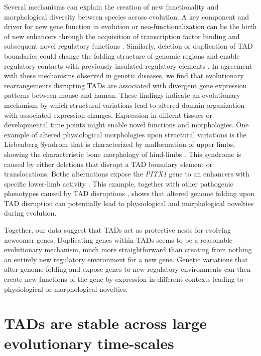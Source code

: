 \documentclass[a4paper,twoside=true,openright,parskip=full,chapterprefix=true,11pt,headings=normal,bibliography=totoc,listof=totoc,titlepage=on,captions=tableabove,draft=false]{scrreprt}
\theoremstyle{definition}
\theoremstyle{definition}
\theoremstyle{definition}
\theoremstyle{remark}
\begin{document}
Several mechanisms can explain the creation of new functionality and
morphological diversity between species across evolution. A key
component and driver for new gene function in evolution or
neo-functionalization can be the birth of new enhancers through the
acquisition of transcription factor binding and subsequent novel
regulatory functions \citep{Long2016}. Similarly, deletion or
duplication of TAD boundaries could change the folding structure of
genomic regions and enable regulatory contacts with previously insulated
regulatory elements \citep{Ibn-Salem2014, Lupianez2015, Franke2017}. In
agreement with these mechanisms observed in genetic diseases, we find
that evolutionary rearrangements disrupting TADs are associated with
divergent gene expression patterns between mouse and human. These
findings indicate an evolutionary mechanism by which structural
variations lead to altered domain organization with associated
expression changes. Expression in differnt tissues or developmental time
points might enable novel functions and morphologies. One example of
altered physiological morphologies upon structural variations is the
Liebenberg Syndrom that is characterized by malformation of upper limbs,
showing the characteristic bone morphology of hind-limbs
\citep{Spielmann2012}. This syndrome is caused by either deletions that
disrupt a TAD boundary element or translocations. Bothe alternations
expose the \emph{PITX1} gene to an enhancers with specific lower-limb
activity \citep{Spielmann2013a}. This example, together with other
pathogenic phenotypes caused by TAD disruptions
\citep{Lupianez2015, Franke2016, Flottmann2017}, shows that altered
genome folding upon TAD disruption can potentially lead to physiological
and morphological novelties during evolution.

Together, our data suggest that TADs act as protective nests for
evolving newcomer genes. Duplicating genes within TADs seems to be a
reasonable evolutionary mechanism, much more straightforward than
creating from nothing an entirely new regulatory environment for a new
gene. Genetic variations that alter genome folding and expose genes to
new regulatory environments can then create new functions of the gene by
expression in different contexts leading to physiological or
morphological novelties.

\hypertarget{tads-are-stable-across-large-evolutionary-time-scales}{%
\section{TADs are stable across large evolutionary
time-scales}\label{tads-are-stable-across-large-evolutionary-time-scales}}
\end{document}
